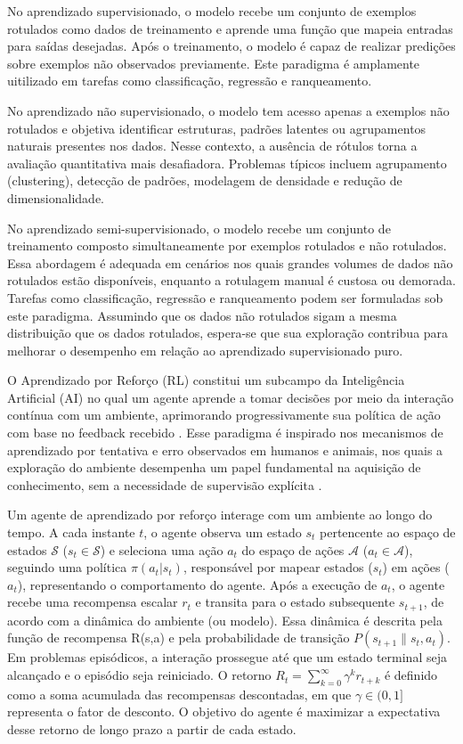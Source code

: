 No aprendizado supervisionado, o modelo recebe um conjunto de exemplos rotulados como dados de treinamento e aprende uma função que mapeia entradas para saídas desejadas. Após o treinamento, o modelo é capaz de realizar predições sobre exemplos não observados previamente. Este paradigma é amplamente uitilizado em tarefas como classificação, regressão e ranqueamento.

No aprendizado não supervisionado, o modelo tem acesso apenas a exemplos não rotulados e objetiva identificar estruturas, padrões latentes ou agrupamentos naturais presentes nos dados. Nesse contexto, a ausência de rótulos torna a avaliação quantitativa mais desafiadora. Problemas típicos incluem agrupamento (clustering), detecção de padrões, modelagem de densidade e redução de dimensionalidade.

No aprendizado semi-supervisionado, o modelo recebe um conjunto de treinamento composto simultaneamente por exemplos rotulados e não rotulados. Essa abordagem é adequada em cenários nos quais grandes volumes de dados não rotulados estão disponíveis, enquanto a rotulagem manual é custosa ou demorada. Tarefas como classificação, regressão e ranqueamento podem ser formuladas sob este paradigma. Assumindo que os dados não rotulados sigam a mesma distribuição que os dados rotulados, espera-se que sua exploração contribua para melhorar o desempenho em relação ao aprendizado supervisionado puro.

O Aprendizado por Reforço (\ac{RL}) constitui um subcampo da Inteligência Artificial (\ac{AI}) no qual um agente aprende a tomar decisões por meio da interação contínua com um ambiente, aprimorando progressivamente sua política de ação com base no feedback recebido \cite{ghasemi2024comprehensive}. Esse paradigma é inspirado nos mecanismos de aprendizado por tentativa e erro observados em humanos e animais, nos quais a exploração do ambiente desempenha um papel fundamental na aquisição de conhecimento, sem a necessidade de supervisão explícita \cite{li2022xrl}.

Um agente de aprendizado por reforço interage com um ambiente ao longo do tempo. A cada instante $t$, o agente observa um estado $s_t$ pertencente ao espaço de estados $\mathcal{S}$ ($s_t \in \mathcal{S}$) e seleciona uma ação $a_t$ do espaço de ações $\mathcal{A}$ ($a_t \in \mathcal{A}$), seguindo uma política \( \pi(a_t|s_t) \), responsável por mapear estados ($s_t$) em ações ($a_t$), representando o comportamento do agente. Após a execução de $a_t$, o agente recebe uma recompensa escalar $r_t$ e transita para o estado subsequente $s_{t+1}$, de acordo com a dinâmica do ambiente (ou modelo). Essa dinâmica é descrita pela função de recompensa R(s,a) e pela probabilidade de transição $P(s_{t+1}\|s_t, a_t)$.
Em problemas episódicos, a interação prossegue até que um estado terminal seja alcançado e o episódio seja reiniciado. O retorno
\( R_t = \sum_{k=0}^{\infty} \gamma^k r_{t+k} \)
é definido como a soma acumulada das recompensas descontadas, em que $\gamma \in (0,1]$ representa o fator de desconto. O objetivo do agente é maximizar a expectativa desse retorno de longo prazo a partir de cada estado.

